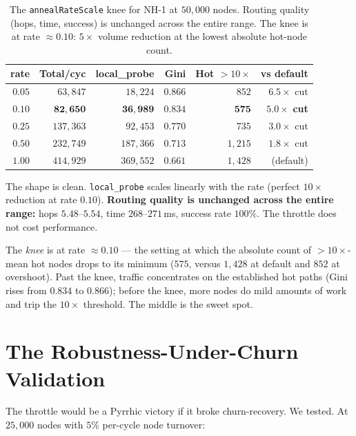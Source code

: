 \documentclass[twoside,nobib]{tufte-book}
\begin{document}
\begin{table}[t]
\centering
\small
\caption{The \texttt{annealRateScale} knee for NH-1 at
$50{,}000$ nodes. Routing quality (hops, time, success) is
unchanged across the entire range. The knee is at rate $\approx
0.10$: $5\times$ volume reduction at the lowest absolute
hot-node count.}
\label{tab:rate-knee}
\begin{tabular}{@{}rrrrrr@{}}
\toprule
\textbf{rate} & \textbf{Total/cyc} & \textbf{local\_probe} &
\textbf{Gini} & \textbf{Hot $>10\times$} & \textbf{vs default} \\
\midrule
$0.05$ & $63{,}847$ & $18{,}224$ & $0.866$ & $852$ & $6.5\times$ cut \\
$\mathbf{0.10}$ & $\mathbf{82{,}650}$ & $\mathbf{36{,}989}$ &
$\mathbf{0.834}$ & $\mathbf{575}$ & $\mathbf{5.0\times}$ \textbf{cut} \\
$0.25$ & $137{,}363$ & $92{,}453$ & $0.770$ & $735$ & $3.0\times$ cut \\
$0.50$ & $232{,}749$ & $187{,}366$ & $0.713$ & $1{,}215$ &
$1.8\times$ cut \\
$1.00$ & $414{,}929$ & $369{,}552$ & $0.661$ & $1{,}428$ & (default) \\
\bottomrule
\end{tabular}
\end{table}

The shape is clean. \texttt{local\_probe} scales linearly with
the rate (perfect $10\times$ reduction at rate $0.10$).
\textbf{Routing quality is unchanged across the entire range:}
hops $5.48$--$5.54$, time $268$--$271$\,ms, success rate
$100\%$. The throttle does not cost performance.

The \emph{knee} is at rate $\approx 0.10$ --- the setting at
which the absolute count of $>10\times$-mean hot nodes drops to
its minimum ($575$, versus $1{,}428$ at default and $852$ at
overshoot). Past the knee, traffic concentrates on the
established hot paths (Gini rises from $0.834$ to $0.866$);
before the knee, more nodes do mild amounts of work and trip
the $10\times$ threshold. The middle is the sweet spot.

\section{The Robustness-Under-Churn Validation}

The throttle would be a Pyrrhic victory if it broke
churn-recovery. We tested. At $25{,}000$ nodes with $5\%$
per-cycle node turnover:
\end{document}

